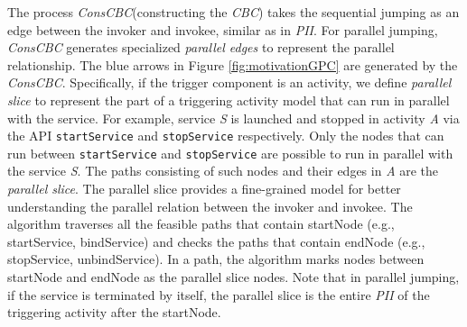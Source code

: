 The process \textit{ConsCBC}(constructing the \textit{CBC}) takes the sequential jumping as an edge between the invoker and invokee, similar as in \textit{PII}. For parallel jumping, \textit{ConsCBC} generates specialized \textit{parallel edges} to represent the parallel relationship. The blue arrows in Figure \ref{fig:motivationGPC} are generated by the \textit{ConsCBC}. 
Specifically, if the trigger component is an activity, we define \textit{parallel slice} to represent the part of a triggering activity model that can run in parallel with the service. For example, service \textit{S} is launched and stopped in activity \textit{A} via the API \texttt{startService} and \texttt{stopService} respectively. Only the nodes that can run between \texttt{startService} and \texttt{stopService} are possible to run in parallel with the service \textit{S}. The paths consisting of such nodes and their edges in \textit{A} are the \textit{parallel slice}. The parallel slice provides a fine-grained model for better understanding the parallel relation between the invoker and invokee. 
The algorithm traverses all the feasible paths that contain startNode (e.g., startService, bindService) and checks the paths that contain endNode (e.g., stopService, unbindService). In a path, the algorithm marks nodes between startNode and endNode as the parallel slice nodes. Note that in parallel jumping, if the service is terminated by itself, the parallel slice is the entire \textit{PII} of the triggering activity after the startNode.

